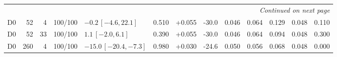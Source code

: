 \begin{longtable}{crrcp{33mm}rrrrrrrr}
\midrule
\endhead
\midrule
\multicolumn{13}{r}{\emph{Continued on next page}}\\
\endfoot
\bottomrule
\endlastfoot
D0 & 52 & 4 & 100/100 & \(-0.2\,[-4.6,22.1]\) & 0.510 & +0.055 & -30.0 & 0.046 & 0.064 & 0.129 & 0.048 & 0.110\\
D0 & 52 & 33 & 100/100 & \(1.1\,[-2.0,6.1]\) & 0.390 & +0.055 & -30.0 & 0.046 & 0.064 & 0.094 & 0.048 & 0.300\\
D0 & 260 & 4 & 100/100 & \(-15.0\,[-20.4,-7.3]\) & 0.980 & +0.030 & -24.6 & 0.050 & 0.056 & 0.068 & 0.048 & 0.000\\

\end{longtable}
